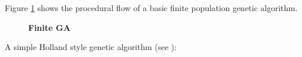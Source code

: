 Figure \ref{FiniteGA} shows the procedural flow of a basic finite population genetic algorithm.
\begin{figure}[H]
\begin{center}
\hspace{4pt}
\caption{\textbf{Finite GA} }
\label{FiniteGA}
\end{center}
\end{figure}

A simple Holland style genetic algorithm (see \cite{Holland1975}):

